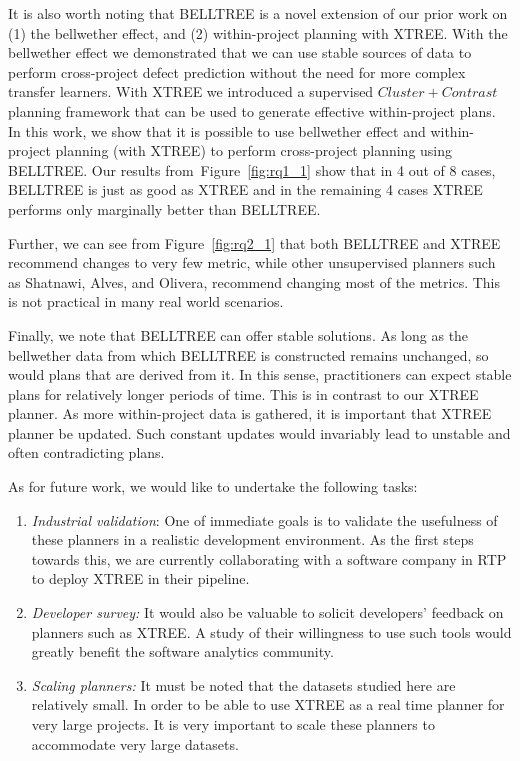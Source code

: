 \documentclass[10pt,journal,compsoc]{IEEEtran}
\newcommand{\be}{\begin{enumerate}}
\newcommand{\ee}{\end{enumerate}}
\newcommand{\fig}[1]{Figure~\ref{fig:#1}}
\begin{document}
It is also worth noting that BELLTREE is a novel extension of our prior work on (1) the bellwether effect, and (2) within-project planning with XTREE. With the bellwether effect we demonstrated that we can use stable sources of data to perform cross-project defect prediction without the need for more complex transfer learners. With XTREE we introduced a supervised $Cluster+Contrast$ planning framework that can be used to generate effective within-project plans. In this work, we show that it is possible to use bellwether effect and within-project planning (with  XTREE) to perform cross-project planning using BELLTREE. Our results from~\fig{rq1_1} show that in 4 out of 8 cases, BELLTREE is just as good as XTREE and in the remaining 4 cases XTREE performs only marginally better than BELLTREE.

Further, we can see from \fig{rq2_1} that both BELLTREE and XTREE recommend changes to very few metric, while other unsupervised planners such as Shatnawi, Alves, and Olivera, recommend changing most of the metrics. This is not practical in many real world scenarios.

Finally, we note that BELLTREE can offer stable solutions. As long as the bellwether data from which BELLTREE is constructed remains unchanged, so would plans that are derived from it. In this sense, practitioners can expect stable plans for relatively longer periods of time. This is in contrast to our XTREE planner. As more within-project data is gathered,  it is important that XTREE planner be updated. Such constant updates would invariably lead to unstable and often contradicting plans.


As for future work, we would like to undertake the following tasks:
\be
\item \textit{Industrial validation}: One of immediate goals is to validate the 
usefulness of these planners in a realistic development environment. As the 
first steps towards this, we are currently collaborating with a software 
company in RTP to deploy XTREE in their pipeline. 
\item \textit{Developer survey: }It would also be valuable to solicit 
developers' feedback on planners such as XTREE. A study of their willingness to 
use such tools would greatly benefit the software analytics community.
\item \textit{Scaling planners:} It must be noted that the datasets studied 
here are relatively small. In order to be able to use XTREE as a real time 
planner for very large projects. It is very important to scale these planners 
to accommodate very large datasets.
\ee

\balance


\end{document}

